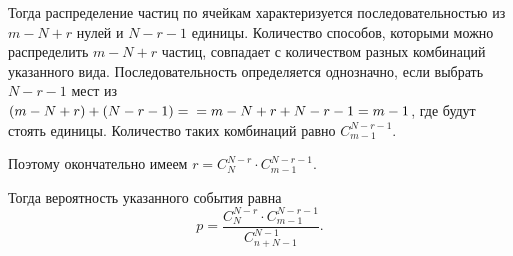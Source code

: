 \documentclass{book}
\begin{document}
Тогда распределение частиц по ячейкам характеризуется последовательностью из $ m - N + r $ нулей и $ N - r - 1 $ единицы.
Количество способов, которыми можно распределить $ m - N + r $ частиц, совпадает с количеством разных комбинаций указанного вида.
Последовательность определяется однозначно, если выбрать $ N - r - 1 $ мест из
$ \left( m - N + r \right) + \left( N - r - 1 \right) = \\
= m - N + r + N - r - 1 = m - 1 $,
где будут стоять единицы.
Количество таких комбинаций равно $ C_{m-1}^{N - r - 1} $.

Поэтому окончательно имеем $ r = C_{N}^{N-r} \cdot C_{m-1}^{N - r - 1} $.

Тогда вероятность указанного события равна
$$ p =
\frac{C_{N}^{N-r} \cdot C_{m-1}^{N - r - 1}}{C_{n+N-1}^{N-1}}.$$
\end{document}
